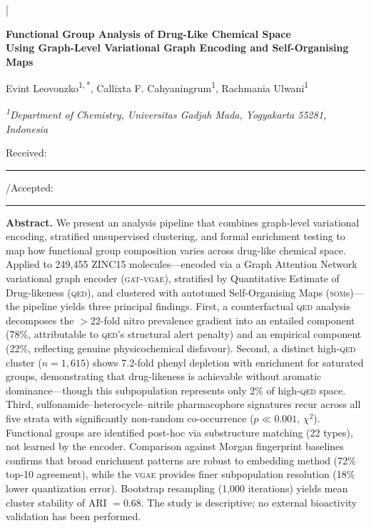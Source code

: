 \documentclass[10pt,a4paper,twocolumn]{article}
\providecommand{\qed}{}
\let\qed\relax
\newcommand{\vgae}{\textsc{vgae}}
\newcommand{\gat}{\textsc{gat}}
\newcommand{\som}{\textsc{som}}
\newcommand{\qedscore}{\textsc{qed}}
\let\qed\qedscore
\begin{document}
\makeatletter
\twocolumn[
\begin{@twocolumnfalse}

\begin{center}
{\Large\bfseries
Functional Group Analysis of Drug-Like Chemical Space\\[3pt]
Using Graph-Level Variational Graph Encoding and Self-Organising Maps\par}

\vspace{10pt}

{\normalsize
Evint Leovonzko\textsuperscript{1,\,*},\quad
Callixta F. Cahyaningrum\textsuperscript{1},\quad
Rachmania Ulwani\textsuperscript{1}\par}

\vspace{4pt}

{\small\itshape
\textsuperscript{1}Department of Chemistry, Universitas Gadjah Mada, Yogyakarta 55281, Indonesia\par}

\vspace{3pt}

{\small Received: \rule{3cm}{0.4pt}\quad/\quad Accepted: \rule{3cm}{0.4pt}}

\vspace{10pt}

\begin{minipage}{0.95\textwidth}
\small
\textbf{Abstract.}\enspace
We present an analysis pipeline that combines graph-level variational encoding, stratified unsupervised clustering, and formal enrichment testing to map how functional group composition varies across drug-like chemical space.
Applied to 249,455 ZINC15 molecules---encoded via a Graph Attention Network variational graph encoder (\gat{}-\vgae{}), stratified by Quantitative Estimate of Drug-likeness (\qed{}), and clustered with autotuned Self-Organising Maps (\som{}s)---the pipeline yields three principal findings.
First, a counterfactual \qed{} analysis decomposes the $>$22-fold nitro prevalence gradient into an entailed component (78\%, attributable to \qed{}'s structural alert penalty) and an empirical component (22\%, reflecting genuine physicochemical disfavour).
Second, a distinct high-\qed{} cluster ($n = 1{,}615$) shows 7.2-fold phenyl depletion with enrichment for saturated groups, demonstrating that drug-likeness is achievable without aromatic dominance---though this subpopulation represents only 2\% of high-\qed{} space.
Third, sulfonamide--heterocycle--nitrile pharmacophore signatures recur across all five strata with significantly non-random co-occurrence ($p \ll 0.001$, $\chi^2$).
Functional groups are identified post-hoc via substructure matching (22 types), not learned by the encoder. Comparison against Morgan fingerprint baselines confirms that broad enrichment patterns are robust to embedding method (72\% top-10 agreement), while the \vgae{} provides finer subpopulation resolution (18\% lower quantization error).
Bootstrap resampling (1{,}000 iterations) yields mean cluster stability of ARI $= 0.68$.
The study is descriptive; no external bioactivity validation has been performed.


\end{minipage}
\end{center}
\end{@twocolumnfalse}
\end{document}
